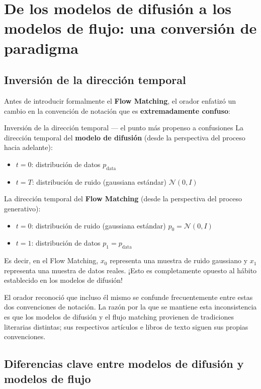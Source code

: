 \documentclass[a4paper]{article}
\begin{document}
\section{De los modelos de difusión a los modelos de flujo: una conversión de paradigma}

\subsection{Inversión de la dirección temporal}

Antes de introducir formalmente el \textbf{Flow Matching}, el orador enfatizó un cambio en la convención de notación que es \textbf{extremadamente confuso}:

\begin{warningbox}{Inversión de la dirección temporal — el punto más propenso a confusiones}
La dirección temporal del \textbf{modelo de difusión} (desde la perspectiva del proceso hacia adelante):
\begin{itemize}
    \item $t = 0$: distribución de datos $p_{\text{data}}$
    \item $t = T$: distribución de ruido (gaussiana estándar) $\mathcal{N}(0, I)$
\end{itemize}

La dirección temporal del \textbf{Flow Matching} (desde la perspectiva del proceso generativo):
\begin{itemize}
    \item $t = 0$: distribución de ruido (gaussiana estándar) $p_0 = \mathcal{N}(0, I)$
    \item $t = 1$: distribución de datos $p_1 = p_{\text{data}}$
\end{itemize}

Es decir, en el Flow Matching, $x_0$ representa una muestra de ruido gaussiano y $x_1$ representa una muestra de datos reales. ¡Esto es completamente opuesto al hábito establecido en los modelos de difusión!
\end{warningbox}

El orador reconoció que incluso él mismo se confunde frecuentemente entre estas dos convenciones de notación. La razón por la que se mantiene esta inconsistencia es que los modelos de difusión y el flujo matching provienen de tradiciones literarias distintas; sus respectivos artículos e libros de texto siguen sus propias convenciones.

\subsection{Diferencias clave entre modelos de difusión y modelos de flujo}
\end{document}
